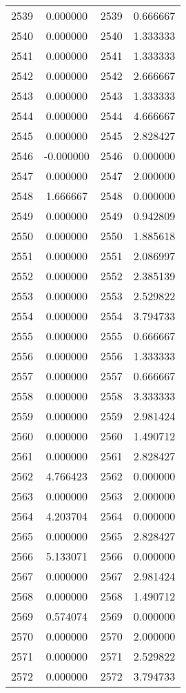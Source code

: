 \documentclass[12pt]{article}
\begin{document}
\begin{longtable}{@{}cccc@{}}
2539 & 0.000000 & 2539 & 0.666667 \\
2540 & 0.000000 & 2540 & 1.333333 \\
2541 & 0.000000 & 2541 & 1.333333 \\
2542 & 0.000000 & 2542 & 2.666667 \\
2543 & 0.000000 & 2543 & 1.333333 \\
2544 & 0.000000 & 2544 & 4.666667 \\
2545 & 0.000000 & 2545 & 2.828427 \\
2546 & -0.000000 & 2546 & 0.000000 \\
2547 & 0.000000 & 2547 & 2.000000 \\
2548 & 1.666667 & 2548 & 0.000000 \\
2549 & 0.000000 & 2549 & 0.942809 \\
2550 & 0.000000 & 2550 & 1.885618 \\
2551 & 0.000000 & 2551 & 2.086997 \\
2552 & 0.000000 & 2552 & 2.385139 \\
2553 & 0.000000 & 2553 & 2.529822 \\
2554 & 0.000000 & 2554 & 3.794733 \\
2555 & 0.000000 & 2555 & 0.666667 \\
2556 & 0.000000 & 2556 & 1.333333 \\
2557 & 0.000000 & 2557 & 0.666667 \\
2558 & 0.000000 & 2558 & 3.333333 \\
2559 & 0.000000 & 2559 & 2.981424 \\
2560 & 0.000000 & 2560 & 1.490712 \\
2561 & 0.000000 & 2561 & 2.828427 \\
2562 & 4.766423 & 2562 & 0.000000 \\
2563 & 0.000000 & 2563 & 2.000000 \\
2564 & 4.203704 & 2564 & 0.000000 \\
2565 & 0.000000 & 2565 & 2.828427 \\
2566 & 5.133071 & 2566 & 0.000000 \\
2567 & 0.000000 & 2567 & 2.981424 \\
2568 & 0.000000 & 2568 & 1.490712 \\
2569 & 0.574074 & 2569 & 0.000000 \\
2570 & 0.000000 & 2570 & 2.000000 \\
2571 & 0.000000 & 2571 & 2.529822 \\
2572 & 0.000000 & 2572 & 3.794733 \\

\end{longtable}
\end{document}
